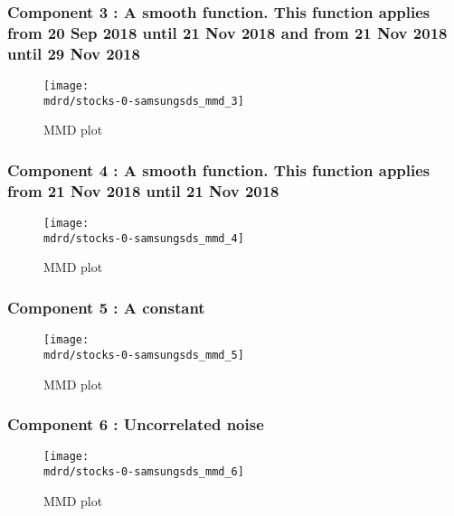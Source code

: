 \documentclass{article} %
\begin{document}
\subsubsection{Component 3 : A smooth function. This function applies from 20 Sep 2018 until 21 Nov 2018 and from 21 Nov 2018 until 29 Nov 2018}

\begin{figure}[H]
\newcommand{\wmgd}{0.5\columnwidth}
\newcommand{\hmgd}{3.0cm}
\newcommand{\mdrd}{stocks-0-samsungsds}
\newcommand{\mbm}{\hspace{-0.3cm}}
\texttt{[image: \\mdrd/stocks-0-samsungsds\_mmd\_3]}
\caption{
MMD plot}
\label{fig:mmd3}
\end{figure}

\subsubsection{Component 4 : A smooth function. This function applies from 21 Nov 2018 until 21 Nov 2018}

\begin{figure}[H]
\newcommand{\wmgd}{0.5\columnwidth}
\newcommand{\hmgd}{3.0cm}
\newcommand{\mdrd}{stocks-0-samsungsds}
\newcommand{\mbm}{\hspace{-0.3cm}}
\texttt{[image: \\mdrd/stocks-0-samsungsds\_mmd\_4]}
\caption{
MMD plot}
\label{fig:mmd4}
\end{figure}

\subsubsection{Component 5 : A constant}

\begin{figure}[H]
\newcommand{\wmgd}{0.5\columnwidth}
\newcommand{\hmgd}{3.0cm}
\newcommand{\mdrd}{stocks-0-samsungsds}
\newcommand{\mbm}{\hspace{-0.3cm}}
\texttt{[image: \\mdrd/stocks-0-samsungsds\_mmd\_5]}
\caption{
MMD plot}
\label{fig:mmd5}
\end{figure}

\subsubsection{Component 6 : Uncorrelated noise}

\begin{figure}[H]
\newcommand{\wmgd}{0.5\columnwidth}
\newcommand{\hmgd}{3.0cm}
\newcommand{\mdrd}{stocks-0-samsungsds}
\newcommand{\mbm}{\hspace{-0.3cm}}
\texttt{[image: \\mdrd/stocks-0-samsungsds\_mmd\_6]}
\caption{
MMD plot}
\label{fig:mmd6}
\end{figure}
\end{document}
